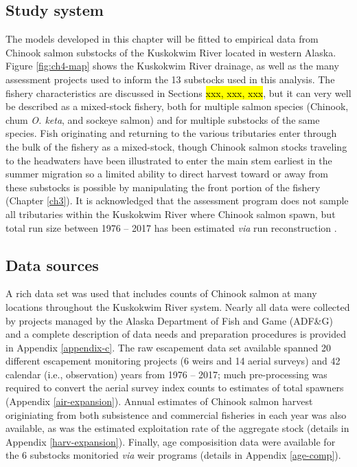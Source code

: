 \documentclass[12pt,]{book}
\theoremstyle{definition}
\theoremstyle{definition}
\theoremstyle{definition}
\theoremstyle{remark}
\begin{document}
\subsection{Study system}\label{study-system}

The models developed in this chapter will be fitted to empirical data
from Chinook salmon substocks of the Kuskokwim River located in western
Alaska. Figure \ref{fig:ch4-map} shows the Kuskokwim River drainage, as
well as the many assessment projects used to inform the 13 substocks
used in this analysis. The fishery characteristics are discussed in
Sections \hl{xxx, xxx, xxx}, but it can very well be described as a
mixed-stock fishery, both for multiple salmon species (Chinook, chum
\emph{O. keta}, and sockeye salmon) and for multiple substocks of the
same species. Fish originating and returning to the various tributaries
enter through the bulk of the fishery as a mixed-stock, though Chinook
salmon stocks traveling to the headwaters have been illustrated to enter
the main stem earliest in the summer migration
\citep{smith-liller-2017a, smith-liller-2017b} so a limited ability to
direct harvest toward or away from these substocks is possible by
manipulating the front portion of the fishery (Chapter \ref{ch3}). It is
acknowledged that the assessment program does not sample all tributaries
within the Kuskokwim River where Chinook salmon spawn, but total run
size between 1976 -- 2017 has been estimated \emph{via} run
reconstruction \citep{liller-etal-2018}.

\subsection{Data sources}\label{data-sources}

A rich data set was used that includes counts of Chinook salmon at many
locations throughout the Kuskokwim River system. Nearly all data were
collected by projects managed by the Alaska Department of Fish and Game
(ADF\&G) and a complete description of data needs and preparation
procedures is provided in Appendix \ref{appendix-c}. The raw escapement
data set available spanned 20 different escapement monitoring projects
(6 weirs and 14 aerial surveys) and 42 calendar (i.e., observation)
years from 1976 -- 2017; much pre-processing was required to convert the
aerial survey index counts to estimates of total spawners (Appendix
\ref{air-expansion}). Annual estimates of Chinook salmon harvest
originiating from both subsistence and commercial fisheries in each year
was also available, as was the estimated exploitation rate of the
aggregate stock (details in Appendix \ref{harv-expansion}). Finally, age
composisition data were available for the 6 substocks monitoried
\emph{via} weir programs (details in Appendix \ref{age-comp}).
\end{document}
